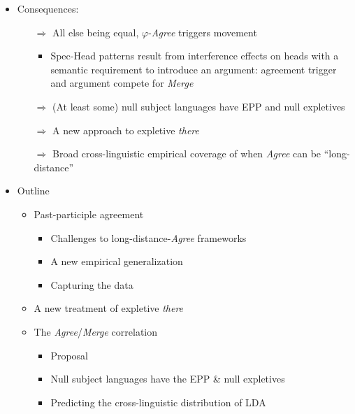 \documentclass[11pt, letterpaper]{paper_nick}
\begin{document}
\begin{itemize}
\item Consequences: 
\begin{itemize}
\item[$\Rightarrow$] All else being equal, $\varphi$-\emph{Agree} triggers movement 
\begin{itemize}
\item Spec-Head patterns result from interference effects on heads with a semantic requirement to introduce an argument: agreement trigger and argument compete for \emph{Merge}
\end{itemize}
\item[$\Rightarrow$] (At least some) null subject languages have EPP and null expletives
\item[$\Rightarrow$] A new approach to expletive \emph{there}
\item[$\Rightarrow$] Broad cross-linguistic empirical coverage of when \emph{Agree} can be ``long-distance''
\end{itemize}
\item Outline
\begin{itemize}
\item Past-participle agreement
\begin{itemize}
\item Challenges to long-distance-\emph{Agree} frameworks
\item A new empirical generalization
\item Capturing the data
\end{itemize}
\item A new treatment of expletive \emph{there}
\item The \emph{Agree}/\emph{Merge} correlation
\begin{itemize}
\item Proposal
\item Null subject languages have the EPP \& null expletives
\item Predicting the cross-linguistic distribution of LDA
\end{itemize}
\end{itemize}
\end{itemize}
\end{document}
